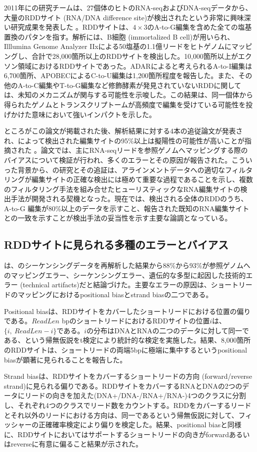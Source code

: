 2011年に\cite{pmid21596952}の研究チームは、27個体のヒトのRNA-seqおよびDNA-seqデータから、大量のRDDサイト (RNA/DNA difference site)が検出されたという非常に興味深い研究成果を発表した \citep{pmid21596952}。RDDサイトは、$4\times3$のA-to-G編集を含めた全ての塩基置換のパタンを指す。解析には、B細胞 (immortalized B cell)が用いられ、Illlumina Genome Analyzer IIxによる50塩基の1.1億リードをヒトゲノムにマッピングし、合計で28,000箇所以上のRDDサイトを検出した。10,000箇所以上がエクソン領域におけるRDDサイトであった。ADARによると考えられるA-to-I編集は6,700箇所、APOBECによるC-to-U編集は1,200箇所程度を報告した。また、その他のA-to-C編集やT-to-G編集など修飾酵素が発見されていないRDDに関しては、未知のメカニズムが関与する可能性を示唆した。この結果は、同一個体から得られたゲノムとトランスクリプトームが高頻度で編集を受けている可能性を投げかけた意味において強いインパクトを示した。
\par
ところがこの論文が掲載された後、解析結果に対する4本の追従論文が発表され、\cite{pmid21596952}によって検出された編集サイトの95\%以上は擬陽性の可能性が高いことが指摘された \citep{pmid22422962, pmid22422964, pmid22422963, pmid22022455}。論文では、主にRNA-seqリードを参照ゲノムへマッピングする際のバイアスについて検証が行われ、多くのエラーとその原因が報告された。こういった背景から、\cite{pmid21596952}の研究とその追証は、アラインメントデータへの適切なフィルタリングが編集サイトの正確な検出には極めて重要な過程であることを示し、複数のフィルタリング手法を組み合せたヒューリスティックなRNA編集サイトの検出手法が開発される契機となった。現在では、検出される全体のRDDのうち、A-to-G 編集が80\%以上のデータを示すこと、報告された既知のRNA編集サイトとの一致を示すことが検出手法の妥当性を示す主要な論調となっている。

\subsection{RDDサイトに見られる多種のエラーとバイアス}
\cite{pmid22422963}は、\cite{pmid21596952}のシーケンシングデータを再解析した結果から88\%から93\%が参照ゲノムへのマッピングエラー、シーケンシングエラー、遺伝的な多型に起因した技術的エラー (technical artifacts)だと結論づけた。主要なエラーの原因は、ショートリードのマッピングにおけるpositional biasとstrand biasの二つである。
\par
Positional biasは、RDDサイトをカバーしたショートリードにおける位置の偏りである。$ReadLen$ bpのショートリードにおけるRDDサイトの位置$i$は、$\{i,\ ReadLen-i\}$である。$i$の分布はDNAとRNAの二つのデータに対して同一である、という帰無仮説をt検定により統計的な検定を実施した。結果、8,000箇所のRDDサイトは、ショートリードの両端5bpに極端に集中するというpositional biasが顕著に見られることを報告した。
\par
Strand biasは、RDDサイトをカバーするショートリードの方向 (forward/reverse strand)に見られる偏りである。RDDサイトをカバーするRNAとDNAの2つのデータにリードの向きを加えた(DNA+/DNA-/RNA+/RNA-)4つのクラスに分割し、それぞれ4つのクラスでリード数をカウントする。RDDをカバーするリードとそれ以外のリードにおける方向は、同一であるという帰無仮説に対して、フィッシャーの正確確率検定により偏りを検定した。結果、positional biasと同様に、RDDサイトにおいてはサポートするショートリードの向きがforwardあるいはreverseに有意に偏ること結果が示された。

